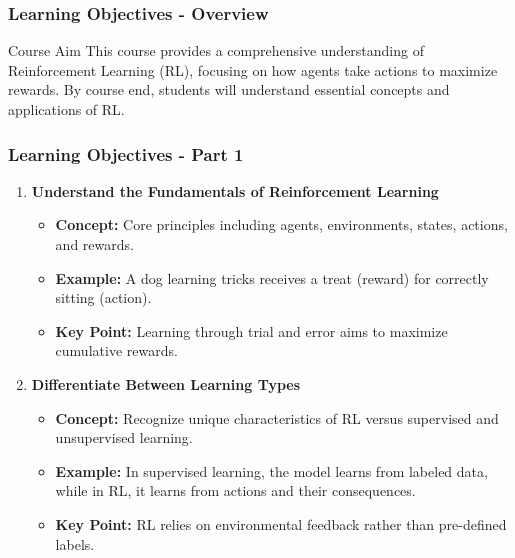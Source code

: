 \documentclass[aspectratio=169]{beamer}
\begin{document}
\begin{frame}[fragile]
  \frametitle{Learning Objectives - Overview}
  \begin{block}{Course Aim}
    This course provides a comprehensive understanding of Reinforcement Learning (RL), focusing on how agents take actions to maximize rewards. By course end, students will understand essential concepts and applications of RL.
  \end{block}
\end{frame}

\begin{frame}[fragile]
  \frametitle{Learning Objectives - Part 1}
  \begin{enumerate}
    \item \textbf{Understand the Fundamentals of Reinforcement Learning}
      \begin{itemize}
        \item \textbf{Concept:} Core principles including agents, environments, states, actions, and rewards.
        \item \textbf{Example:} A dog learning tricks receives a treat (reward) for correctly sitting (action).
        \item \textbf{Key Point:} Learning through trial and error aims to maximize cumulative rewards.
      \end{itemize}
  
    \item \textbf{Differentiate Between Learning Types}
      \begin{itemize}
        \item \textbf{Concept:} Recognize unique characteristics of RL versus supervised and unsupervised learning.
        \item \textbf{Example:} In supervised learning, the model learns from labeled data, while in RL, it learns from actions and their consequences.
        \item \textbf{Key Point:} RL relies on environmental feedback rather than pre-defined labels.
      \end{itemize}
  \end{enumerate}
\end{frame}
\end{document}
